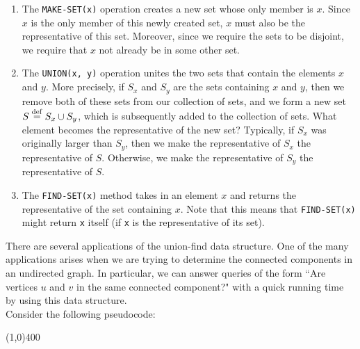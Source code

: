 \begin{enumerate}
    \item The \verb!MAKE-SET(x)! operation creates a new set whose only member is $x$. Since $x$ is the only member of this newly created set, $x$ must also be the representative of this set. Moreover, since we require the sets to be disjoint, we require that $x$ not already be in some other set.
    \item The \verb!UNION(x, y)! operation unites the two sets that contain the elements $x$ and $y$. More precisely, if $S_x$ and $S_y$ are the sets containing $x$ and $y$, then we remove both of these sets from our collection of sets, and we form a new set $S \overset{\mathrm{def}}{=} S_x \cup S_y$, which is subsequently added to the collection of sets. What element becomes the representative of the new set? Typically, if $S_x$ was originally larger than $S_y$, then we make the representative of $S_x$ the representative of $S$. Otherwise, we make the representative of $S_y$ the representative of $S$.
    \item The \verb!FIND-SET(x)! method takes in an element $x$ and returns the representative of the set containing $x$. Note that this means that \verb!FIND-SET(x)! might return \verb!x! itself (if \verb!x! is the representative of its set). 
\end{enumerate}


There are several applications of the union-find data structure. One of the many applications arises when we are trying to determine the connected components in an undirected graph. In particular, we can answer queries of the form ``Are vertices $u$ and $v$ in the same connected component?" with a quick running time by using this data structure. \\


Consider the following pseudocode:

\vspace{1em}
\begin{center}
\line(1,0){400}
\end{center}

